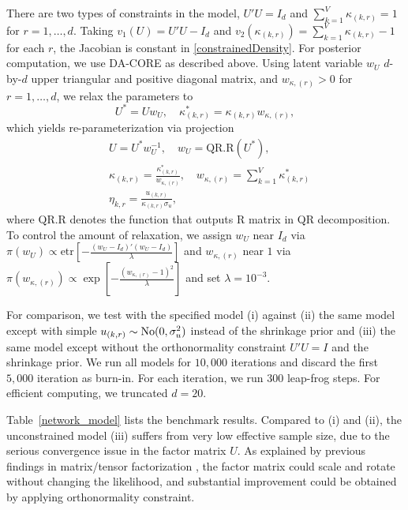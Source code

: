 \documentclass[10pt,fleqn]{article} \pdfoutput=1
\DeclareMathOperator{\1}{\mathbbm{1}} \DeclareMathOperator{\bigO}{\mc O}
\begin{document}
There are two types of constraints in the model,  $U'U=I_d$ and
$\sum_{k=1}^V \kappa_{(k,r)}=1$ for $r=1,\ldots,d$. Taking $v_1(U)=
	U'U-I_d$ and $v_2(\kappa_{(k,r)})=\sum_{k=1}^V \kappa_{(k,r)}-1$ for each
$r$, the Jacobian is  constant in \eqref{constrainedDensity}. For posterior
computation, we use DA-CORE as described above.  Using latent variable
$w_U$ $d$-by-$d$ upper triangular and positive diagonal matrix, and
$w_{\kappa,{(r)}}>0$  for $r=1,\ldots ,d$, we relax the parameters to
$$U^*=U w_U, \quad \kappa^*_{(k,r)}=\kappa_{(k,r)} w_{\kappa,{(r)}},$$
which yields re-parameterization via  projection \begin{equation}
	\begin{aligned}  & U=U^* w_U^{-1}, \quad  w_U=\text{QR.R}(U^*),        \\ &
		\kappa_{(k,r)} = \frac{\kappa^*_{(k,r)}}{w_{\kappa,{(r)}}},
		\quad  w_{\kappa,{(r)}}= \sum_{k=1}^V \kappa^*_{(k,r)} \\ &
		\eta_{k,r}= \frac{u_{(k,r)}}{\kappa_{(k,r)}\sigma_{u}},
	\end{aligned}   \end{equation}where $\text{QR.R}$ denotes the function that
outputs $\text{R}$ matrix in QR decomposition.  To control the amount of
relaxation, we assign $w_U$ near $I_d$ via $\pi(w_U)\propto
	\text{etr}\left[ -\frac{(w_U-I_d)'(w_U-I_d)}{\lambda}\right]$ and
$w_{\kappa,{(r)}}$ near $1$ via $\pi(w_{\kappa,{(r)}})\propto \exp\left[
		-\frac{(w_{\kappa,{(r)}}-1)^2}{\lambda}\right]$ and set $\lambda=10^{-3}$.


For comparison, we test with the specified model (i) against (ii) the  same
model except with simple $u_{(k,r)}\sim \operatorname{No} (0,\sigma^2_u)$ instead of the
shrinkage prior and (iii) the  same model except  without the
orthonormality constraint $U'U=I$ and the shrinkage prior.  We run all
models for $10,000$ iterations and discard the first $5,000$ iteration as
burn-in.  For each iteration, we run $300$ leap-frog steps. For efficient
computing, we truncated $d=20$.

Table~\ref{network_model} lists the benchmark results. Compared to (i) and
(ii), the unconstrained model (iii) suffers from very low effective sample
size, due to the serious convergence issue in the factor matrix $U$. As
explained by previous findings in matrix/tensor factorization
\citep{hoff2016equivariant},   the factor matrix could scale and rotate
without changing the likelihood,  and  substantial improvement could be
obtained by applying orthonormality constraint.
\end{document}
